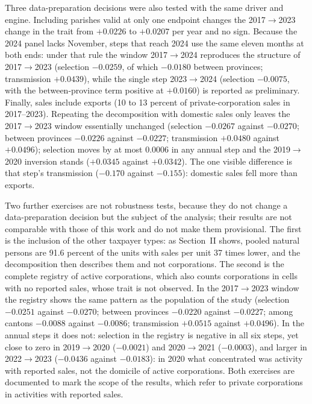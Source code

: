 \documentclass[conference]{IEEEtran}
\begin{document}
Three data-preparation decisions were also tested with the same driver
and engine. Including parishes valid at only one endpoint changes the
2017$\to$2023 change in the trait from $+0.0226$ to $+0.0207$ per year
and no sign. Because the 2024 panel lacks November, steps that reach 2024
use the same eleven months at both ends: under that rule the window
2017$\to$2024 reproduces the structure of 2017$\to$2023 (selection
$-0.0259$, of which $-0.0180$ between provinces; transmission $+0.0439$),
while the single step 2023$\to$2024 (selection $-0.0075$, with the
between-province term positive at $+0.0160$) is reported as preliminary.
Finally, sales include exports (10 to 13 percent of private-corporation
sales in 2017--2023). Repeating the decomposition with domestic sales
only leaves the 2017$\to$2023 window essentially unchanged (selection
$-0.0267$ against $-0.0270$; between provinces $-0.0226$ against
$-0.0227$; transmission $+0.0480$ against $+0.0496$); selection moves by
at most $0.0006$ in any annual step and the 2019$\to$2020 inversion
stands ($+0.0345$ against $+0.0342$). The one visible difference is that
step's transmission ($-0.170$ against $-0.155$): domestic sales fell more
than exports. 

Two further exercises are not robustness tests, because they do not change
a data-preparation decision but the subject of the analysis; their results
are not comparable with those of this work and do not make them
provisional. The first is the inclusion of the other taxpayer types: as
Section~II shows, pooled natural persons are 91.6 percent of the units
with sales per unit 37 times lower, and the decomposition then describes
them and not corporations. The second is the complete registry of active
corporations, which also counts corporations in cells with no reported
sales, whose trait is not observed. In the 2017$\to$2023 window the
registry shows the same pattern as the population of the study (selection
$-0.0251$ against $-0.0270$; between provinces $-0.0220$ against
$-0.0227$; among cantons $-0.0088$ against $-0.0086$; transmission
$+0.0515$ against $+0.0496$). In the annual steps it does not: selection
in the registry is negative in all six steps, yet close to zero in
2019$\to$2020 ($-0.0021$) and 2020$\to$2021 ($-0.0003$), and larger in
2022$\to$2023 ($-0.0436$ against $-0.0183$): in 2020 what concentrated was
activity with reported sales, not the domicile of active corporations.
Both exercises are documented to mark the scope of the results, which
refer to private corporations in activities with reported sales.
\end{document}

